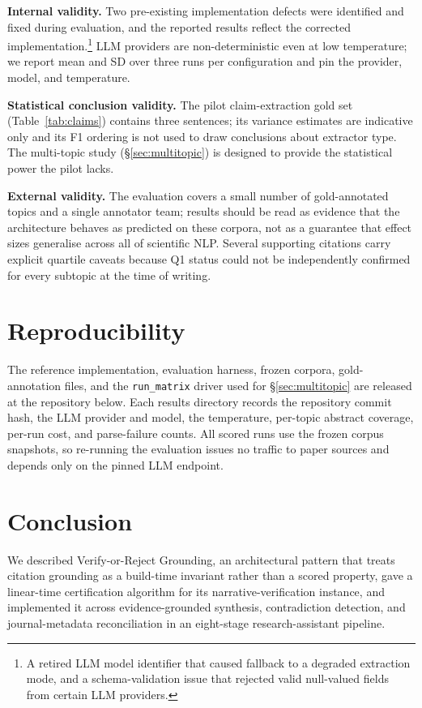 \documentclass[11pt]{article}
\newcommand{\NumRuns}{three}     %
\begin{document}
\textbf{Internal validity.} Two pre-existing implementation defects were
identified and fixed during evaluation, and the reported results reflect the
corrected implementation.\footnote{A retired LLM model identifier that caused
fallback to a degraded extraction mode, and a schema-validation issue that
rejected valid null-valued fields from certain LLM providers.} LLM providers
are non-deterministic even at low temperature; we report mean and SD over
\NumRuns{} runs per configuration and pin the provider, model, and temperature.

\textbf{Statistical conclusion validity.} The pilot claim-extraction gold set
(Table~\ref{tab:claims}) contains three sentences; its variance estimates are
indicative only and its F1 ordering is not used to draw conclusions about
extractor type. The multi-topic study (\S\ref{sec:multitopic}) is designed to
provide the statistical power the pilot lacks.

\textbf{External validity.} %
The evaluation covers a small number of gold-annotated topics and a single
annotator team; results should be read as evidence that the architecture
behaves as predicted on these corpora, not as a guarantee that effect sizes
generalise across all of scientific NLP. Several supporting citations carry
explicit quartile caveats because Q1 status could not be independently confirmed
for every subtopic at the time of writing.

\section{Reproducibility}
\label{sec:repro}

The reference implementation, evaluation harness, frozen corpora, gold-annotation
files, and the \texttt{run\_matrix} driver used for \S\ref{sec:multitopic} are
released at the repository below. Each results directory records the repository
commit hash, the LLM provider and model, the temperature, per-topic abstract
coverage, per-run cost, and parse-failure counts. All scored runs use the frozen
corpus snapshots, so re-running the evaluation issues no traffic to paper
sources and depends only on the pinned LLM endpoint.

\section{Conclusion}

We described Verify-or-Reject Grounding, an architectural pattern that treats
citation grounding as a build-time invariant rather than a scored property, gave
a linear-time certification algorithm for its narrative-verification instance,
and implemented it across evidence-grounded synthesis, contradiction detection,
and journal-metadata reconciliation in an eight-stage research-assistant
pipeline.
\end{document}
